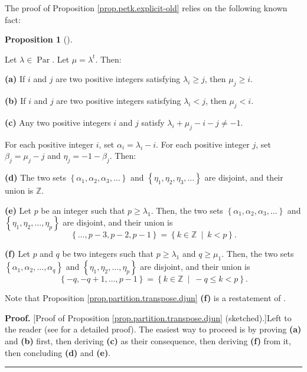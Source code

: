 \documentclass[numbers=enddot,12pt,final,onecolumn,notitlepage]{scrartcl}%
\theoremstyle{definition}
\newtheorem{prop}[theo]{Proposition}
\newenvironment{proposition}[1][]
{\begin{prop}[#1]\begin{leftbar}}
{\end{leftbar}\end{prop}}
\newenvironment{proof}[1][Proof]{\noindent\textbf{#1.} }{\ \rule{0.5em}{0.5em}}
\newenvironment{vershort}{}{}
\begin{document}
The proof of Proposition \ref{prop.petk.explicit-old} relies on the following
known fact:

\begin{proposition}
\label{prop.partition.transpose.djun}Let $\lambda\in\operatorname*{Par}$. Let
$\mu=\lambda^{t}$. Then:

\textbf{(a)} If $i$ and $j$ are two positive integers satisfying $\lambda
_{i}\geq j$, then $\mu_{j}\geq i$.

\textbf{(b)} If $i$ and $j$ are two positive integers satisfying $\lambda
_{i}<j$, then $\mu_{j}<i$.

\textbf{(c)} Any two positive integers $i$ and $j$ satisfy $\lambda_{i}%
+\mu_{j}-i-j\neq-1$.

For each positive integer $i$, set $\alpha_{i}=\lambda_{i}-i$. For each
positive integer $j$, set $\beta_{j}=\mu_{j}-j$ and $\eta_{j}=-1-\beta_{j}$. Then:

\textbf{(d)} The two sets $\left\{  \alpha_{1},\alpha_{2},\alpha_{3}%
,\ldots\right\}  $ and $\left\{  \eta_{1},\eta_{2},\eta_{3},\ldots\right\}  $
are disjoint, and their union is $\mathbb{Z}$.

\textbf{(e)} Let $p$ be an integer such that $p\geq\lambda_{1}$. Then, the two
sets $\left\{  \alpha_{1},\alpha_{2},\alpha_{3},\ldots\right\}  $ and
$\left\{  \eta_{1},\eta_{2},\ldots,\eta_{p}\right\}  $ are disjoint, and their
union is
\[
\left\{  \ldots,p-3,p-2,p-1\right\}  =\left\{  k\in\mathbb{Z}\ \mid
\ k<p\right\}  .
\]


\textbf{(f)} Let $p$ and $q$ be two integers such that $p\geq\lambda_{1}$ and
$q\geq\mu_{1}$. Then, the two sets $\left\{  \alpha_{1},\alpha_{2}%
,\ldots,\alpha_{q}\right\}  $ and $\left\{  \eta_{1},\eta_{2},\ldots,\eta
_{p}\right\}  $ are disjoint, and their union is
\[
\left\{  -q,-q+1,\ldots,p-1\right\}  =\left\{  k\in\mathbb{Z}\ \mid\ -q\leq
k<p\right\}  .
\]

\end{proposition}

Note that Proposition \ref{prop.partition.transpose.djun} \textbf{(f)} is a
restatement of \cite[Chapter I, (1.7)]{Macdon95}.

\begin{vershort}
\begin{proof}
[Proof of Proposition \ref{prop.partition.transpose.djun} (sketched).]Left to
the reader (see \cite{verlong} for a detailed proof). The easiest way to
proceed is by proving \textbf{(a)} and \textbf{(b)} first, then deriving
\textbf{(c)} as their consequence, then deriving \textbf{(f)} from it, then
concluding \textbf{(d)} and \textbf{(e)}.
\end{proof}
\end{vershort}
\end{document}

